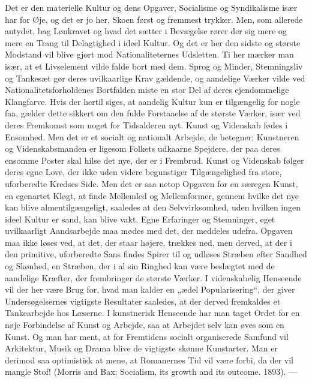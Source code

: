 \documentclass[12pt,a4paper,openany]{book}
\newcommand{\opage}[1]{\marginnote{\footnotesize\textit{[#1]}}}
\begin{document}
Det er den materielle Kultur og dens Opgaver, Socialisme og
Syndikalisme især har for Øje, og det er jo her, Skoen først og fremmest
trykker. Men, som allerede antydet, bag Lønkravet og hvad
det sætter i Bevægelse rører der sig mere og mere en Trang til Delagtighed
i ideel Kultur. Og det er her den sidste og største Modstand
vil blive gjort mod Nationaliteternes Udsletten. Ti her mærker man
især, at et Livselement vilde falde bort med dem. Sprog og Minder,
Stemningsliv og Tankesæt gør deres uvilkaarlige Krav gældende, og
aandelige Værker vilde ved Nationalitetsforholdenes Bortfalden miste
en stor Del af deres ejendommelige Klangfarve. Hvis der hertil siges,
at aandelig Kultur kun er tilgængelig for nogle faa, gælder dette sikkert
om den fulde Forstaaelse af de største Værker, især ved deres
Fremkomst som noget for Tidsalderen nyt. Kunst og Videnskab fødes
i Ensomhed. Men det er et socialt og nationalt Arbejde, de betegner;
Kunstneren og Videnskabsmanden er ligesom Folkets udkaarne Spejdere,
der paa deres ensomme Poster skal hilse det nye, der er i Frembrud.
Kunst og Videnskab følger deres egne Love, der ikke uden
videre begunstiger Tilgængelighed fra store, uforberedte Kredses Side.
Men det er saa netop Opgaven for en særegen Kunst, en egenartet
Kløgt, at finde Mellemled og Mellemformer, gennem hvilke det nye
kan blive almentilgængeligt, saaledes at den Selvvirksomhed, uden
hvilken ingen ideel Kultur er sand, kan blive vakt. Egne Erfaringer
og Stemninger, eget uvilkaarligt Aandsarbejde maa mødes med det,
der meddeles udefra. Opgaven maa ikke løses ved, at det, der staar
højere, trækkes ned, men derved, at der i den primitive, uforberedte
Sans findes Spirer til og udløses Stræben efter Sandhed og Skønhed,
en Stræben, der i al sin Ringhed kan være beslægtet med de
aandelige Kræfter, der frembringer de største Værker. I videnskabelig
Henseende vil der her være Brug for, hvad man kalder en „ædel
Popularisering“, der giver Undersøgelsernes vigtigste Resultater saaledes,
at der derved fremkaldes et Tankearbejde hos Læserne. I
kunstnerisk Henseende har man taget Ordet for en nøje Forbindelse
af Kunst og Arbejde, saa at Arbejdet selv kan øves som en Kunst.
Og man har ment, at for Fremtidens socialt organiserede Samfund
\opage{113}vil Arkitektur, Musik og Drama blive de vigtigste skønne Kunstarter.
Man er derimod saa optimistisk at mene, at Romanernes Tid vil
være forbi, da der vil mangle Stof! (Morris and Bax: Socialism, its
growth and its outcome. 1893). ---
\end{document}
